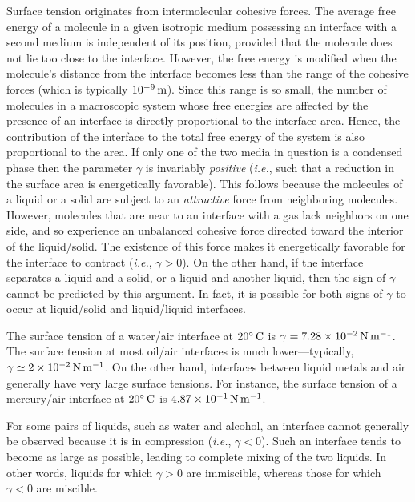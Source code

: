 Surface tension originates from intermolecular cohesive forces. The average free energy of a molecule
in a given isotropic medium possessing an interface with a second medium is independent of its position, provided that the molecule does not lie too close to the interface. However, the free energy is modified when the molecule's distance from
the interface becomes less than the range of the cohesive forces (which is typically $10^{-9}\,{\rm m}$). Since this
range is so small, the number of molecules in a macroscopic system whose free energies are affected by the presence of an interface is directly
proportional to the interface area. Hence, the contribution of the interface to the total free energy
of the system is also proportional to the  area. If only one of the two media
in question is a condensed phase then the parameter $\gamma$ is invariably {\em positive}\/ ({\em i.e.}, such that a
reduction in the surface area is energetically favorable). This follows because
the molecules of a liquid or a solid are subject to an {\em attractive}\/ force from neighboring molecules.
However, molecules that are near to an interface with a gas lack neighbors on one side, and
so experience an unbalanced cohesive force directed toward the interior of the liquid/solid. The
existence of this force makes it energetically favorable for  the interface to contract ({\em i.e.}, $\gamma>0$). 
On the other hand, if the interface
separates a liquid and a solid, or a liquid and another liquid, then the sign of $\gamma$ cannot be predicted
by this argument. In fact, it is possible for both signs of $\gamma$ to occur at liquid/solid and liquid/liquid interfaces. 

The surface tension of a water/air interface at $20^\circ\,{\rm C}$ is $\gamma=7.28\times 10^{-2}\,{\rm N\,m^{-1}}$. The
surface tension at  most
oil/air interfaces is much lower---typically, $\gamma\simeq 2\times 10^{-2}\,{\rm N\,m^{-1}}$. On the other hand, 
interfaces between  liquid metals and air generally have  very large surface tensions. For instance, the surface 
tension of a mercury/air interface at $20^\circ\,{\rm C}$
is $4.87\times 10^{-1}\,{\rm N\,m^{-1}}$. 

For some pairs of liquids, such as water and alcohol, an
interface cannot generally be observed because it is in compression ({\em i.e.}, $\gamma<0$). Such an interface tends
to become as large as possible, leading to complete mixing of the two liquids. In other words, liquids for
which $\gamma>0$ are immiscible, whereas those for which $\gamma<0$ are miscible.  

